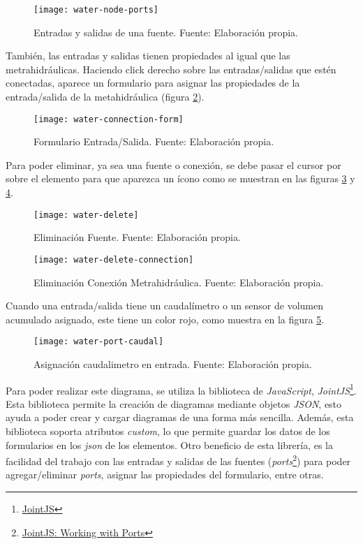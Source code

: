 \begin{figure}[H]
	\centering
	\texttt{[image: water-node-ports]}
	\caption{\label{fig:water-node-ports} Entradas y salidas de una fuente. Fuente: Elaboración propia.}
\end{figure}

También, las entradas y salidas tienen propiedades al igual que las metrahidráulicas. Haciendo click derecho sobre las entradas/salidas que estén conectadas, aparece un formulario para asignar las propiedades de la entrada/salida de la metahidráulica (figura \ref{fig:water-conexion-form}).

\begin{figure}[H]
	\centering
	\texttt{[image: water-connection-form]}
	\caption{\label{fig:water-conexion-form} Formulario Entrada/Salida. Fuente: Elaboración propia.}
\end{figure}

Para poder eliminar, ya sea una fuente o conexión, se debe pasar el cursor por sobre el elemento para que aparezca un ícono como se muestran en las figuras \ref{fig:water-delete} y \ref{fig:water-delete-connection}.

\begin{figure}[H]
	\centering
	\texttt{[image: water-delete]}
	\caption{\label{fig:water-delete} Eliminación Fuente. Fuente: Elaboración propia.}
\end{figure}

\begin{figure}[H]
	\centering
	\texttt{[image: water-delete-connection]}
	\caption{\label{fig:water-delete-connection} Eliminación Conexión Metrahidráulica. Fuente: Elaboración propia.}
\end{figure}

Cuando una entrada/salida tiene un caudalímetro o un sensor de volumen acumulado asignado, este tiene un color rojo, como muestra en la figura \ref{fig:water-port-caudal}.

\begin{figure}[H]
	\centering
	\texttt{[image: water-port-caudal]}
	\caption{\label{fig:water-port-caudal} Asignación caudalimetro en entrada. Fuente: Elaboración propia.}
\end{figure}

Para poder realizar este diagrama, se utiliza la biblioteca de \textit{JavaScript}, \textit{JointJS}\footnote{\href{https://www.jointjs.com/}{JointJS}}. 
Esta biblioteca permite la creación de diagramas mediante objetos \textit{JSON}, esto ayuda a poder crear y cargar diagramas de una forma más sencilla. Además, esta biblioteca soporta atributos \textit{custom}, lo que permite guardar los datos de los formularios en los \textit{json} de los elementos.
Otro beneficio de esta librería, es la facilidad del trabajo con las entradas y salidas de las fuentes (\textit{ports}\footnote{\href{https://resources.jointjs.com/tutorial/ports}{JointJS: Working with Ports}}) para poder agregar/eliminar \textit{ports}, asignar las propiedades del formulario, entre otras.

